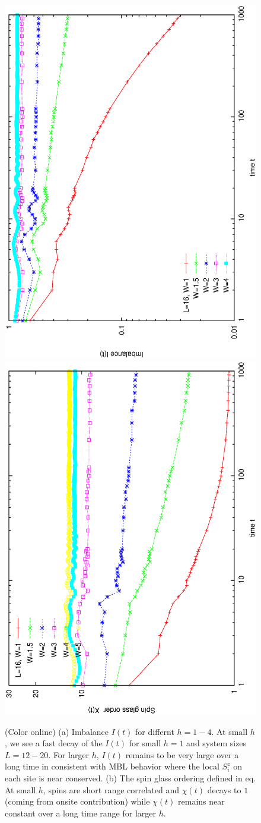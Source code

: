 \documentclass[prl,aps,epsf,showpacs,twocolumn]{revtex4}
\begin{document}
\begin{figure}[b]
  \includegraphics[angle=-90,width=3.in]{newfig2a.ps}\\
  \vspace{-0.0in}
  \includegraphics[angle=-90,width=3.in]{newfig2b.ps}\\
  \hspace{0.0in}
  \vspace{-0.in}
  \caption{(Color online) (a) Imbalance $I(t)$ for differnt $h=1-4$.
    At small $h$, we see a fast decay of the $I(t)$ for small $h=1$ and system
    sizes $L=12-20$.
    For larger $h$, $I(t)$ remains to be very large over a long time in
    consistent with MBL behavior where the local $S^z_i$ on each site is near
    conserved.
    (b) The spin glass ordering defined in eq.
    At small $h$, spins are short range correlated and $\chi(t)$ decays to $1$
    (coming from onsite contribution) while $\chi(t)$ remains near constant over
    a long time range for larger $h$.
  }
\label{fig4}
\end{figure}
\end{document}
